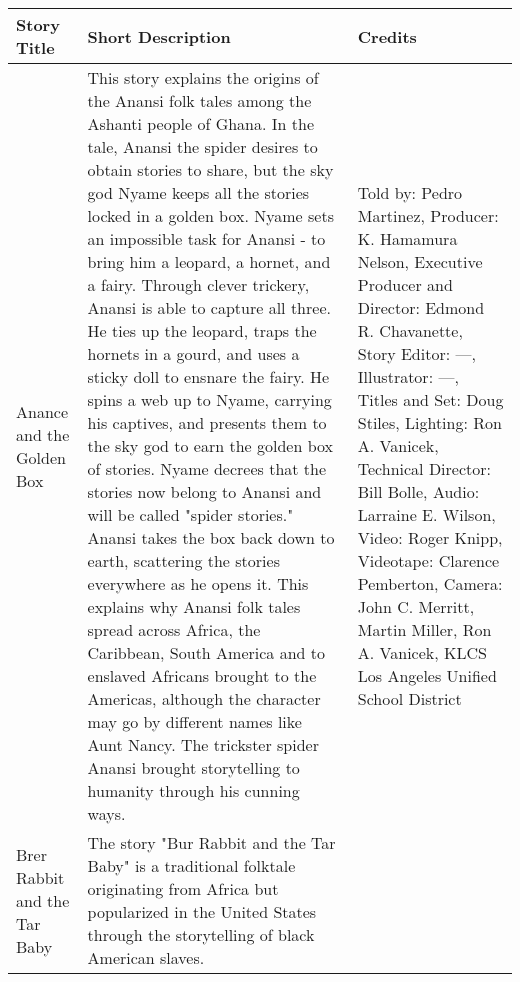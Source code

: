\begin{table}[h]
    \centering
    \begin{small}

        \begin{tabular}{|p{1.5cm}|p{8.5cm}|p{7cm}|}
            \hline
            \textbf{Story Title} & \textbf{Short Description} & \textbf{Credits} \\
            \hline
            Anance and the Golden Box
                                 &
            This story explains the origins of the Anansi folk tales among the Ashanti people of Ghana.
            In the tale, Anansi the spider desires to obtain stories to share, but the sky god Nyame keeps all the stories locked in a golden box.
            Nyame sets an impossible task for Anansi - to bring him a leopard, a hornet, and a fairy.
            Through clever trickery, Anansi is able to capture all three.
            He ties up the leopard, traps the hornets in a gourd, and uses a sticky doll to ensnare the fairy.
            He spins a web up to Nyame, carrying his captives, and presents them to the sky god to earn the golden box of stories.
            Nyame decrees that the stories now belong to Anansi and will be called "spider stories."
            Anansi takes the box back down to earth, scattering the stories everywhere as he opens it.
            This explains why Anansi folk tales spread across Africa, the Caribbean, South America and to enslaved Africans brought to the Americas, although the character may go by different names like Aunt Nancy.
            The trickster spider Anansi brought storytelling to humanity through his cunning ways.
                                 &
            Told by: Pedro Martinez,
            Producer: K. Hamamura Nelson,
            Executive Producer and Director: Edmond R. Chavanette,
            Story Editor: ---,
            Illustrator: ---,
            Titles and Set: Doug Stiles,
            Lighting: Ron A. Vanicek,
            Technical Director: Bill Bolle,
            Audio: Larraine E. Wilson,
            Video: Roger Knipp,
            Videotape: Clarence Pemberton,
            Camera: John C. Merritt, Martin Miller, Ron A. Vanicek,
            KLCS Los Angeles Unified School District
            \\
            \hline
            Brer Rabbit and the Tar Baby
                                 &
            The story "Bur Rabbit and the Tar Baby" is a traditional folktale originating from Africa but popularized in the United States through the storytelling of black American slaves.

\end{tabular}
\end{small}
\end{table}
